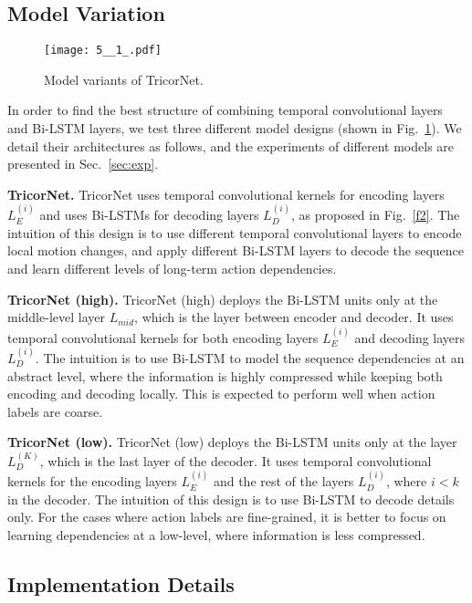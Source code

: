 \documentclass{article}
\begin{document}
\subsection{Model Variation}

\begin{figure}[t]
\centering
\texttt{[image: 5\_\_1\_.pdf]}
\caption{Model variants of TricorNet.}
\label{f5}
\end{figure}

In order to find the best structure of combining temporal convolutional layers and Bi-LSTM layers, we test three different model designs (shown in Fig.~\ref{f5}). We detail their architectures as follows, and the experiments of different models are presented in Sec.~\ref{sec:exp}.

\noindent \textbf{TricorNet.} \quad TricorNet uses temporal convolutional kernels for encoding layers $L_{E}^{(i)}$ and uses Bi-LSTMs for decoding layers $L_{D}^{(i)}$, as proposed in Fig.~\ref{f2}. The intuition of this design is to use different temporal convolutional layers to encode local motion changes, and apply different Bi-LSTM layers to decode the sequence and learn different levels of long-term action dependencies.

\noindent \textbf{TricorNet (high).} \quad TricorNet (high) deploys the Bi-LSTM units only at the middle-level layer $L_{mid}$, which is the layer between encoder and decoder. It uses temporal convolutional kernels for both encoding layers $L_{E}^{(i)}$ and decoding layers $L_{D}^{(i)}$. The intuition is to use Bi-LSTM to model the sequence dependencies at an abstract level, where the information is highly compressed while keeping both encoding and decoding locally. This is expected to perform well when action labels are coarse.

\noindent \textbf{TricorNet (low).} \quad TricorNet (low) deploys the Bi-LSTM units only at the layer $L_D^{(K)}$, which is the last layer of the decoder. It uses temporal convolutional kernels for the encoding layers $L_{E}^{(i)}$ and the rest of the layers $L_{D}^{(i)}$, where $i<k$ in the decoder. The intuition of this design is to use Bi-LSTM to decode details only. For the cases where action labels are fine-grained, it is better to focus on learning dependencies at a low-level, where information is less compressed.


\subsection{Implementation Details}
\end{document}

